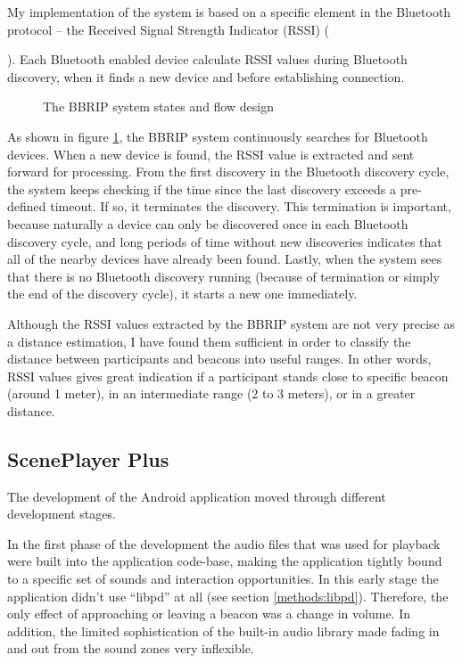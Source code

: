 \documentclass[a4paper,11pt]{article}
\begin{document}
My implementation of the system is based on a specific element in the Bluetooth protocol -- the Received Signal Strength Indicator (RSSI) ({\cite{bray12}).
Each Bluetooth enabled device calculate RSSI values during Bluetooth discovery, when it finds a new device and before establishing connection.

\begin{figure}[!htb]
	\centering
	\def\svgwidth{\columnwidth}
  	
	\caption{The BBRIP system states and flow design}\label{fig:bbrip}
\end{figure}

As shown in figure \ref{fig:bbrip}, the BBRIP system continuously searches for Bluetooth devices.
When a new device is found, the RSSI value is extracted and sent forward for processing.
From the first discovery in the Bluetooth discovery cycle, the system keeps checking if the time since the last discovery exceeds a pre-defined timeout.
If so, it terminates the discovery.
This termination is important, because naturally a device can only be discovered once in each Bluetooth discovery cycle, and long periods of time without new discoveries indicates that all of the nearby devices have already been found.
Lastly, when the system sees that there is no Bluetooth discovery running (because of termination or simply the end of the discovery cycle), it starts a new one immediately.

Although the RSSI values extracted by the BBRIP system are not very precise as a distance estimation, I have found them sufficient in order to classify the distance between participants and beacons into useful ranges.
In other words, RSSI values gives great indication if a participant stands close to specific beacon (around 1 meter), in an intermediate range (2 to 3 meters), or in a greater distance.

\subsection{ScenePlayer Plus}\label{sceneplayer_plus}

The development of the Android application moved through different development stages.

In the first phase of the development the audio files that was used for playback were built into the application code-base, making the application tightly bound to a specific set of sounds and interaction opportunities.
In this early stage the application didn't use ``libpd'' at all (see section \ref{methods:libpd}).
Therefore, the only effect of approaching or leaving a beacon was a change in volume.
In addition, the limited sophistication of the built-in audio library made fading in and out from the sound zones very inflexible.

}
\end{document}
